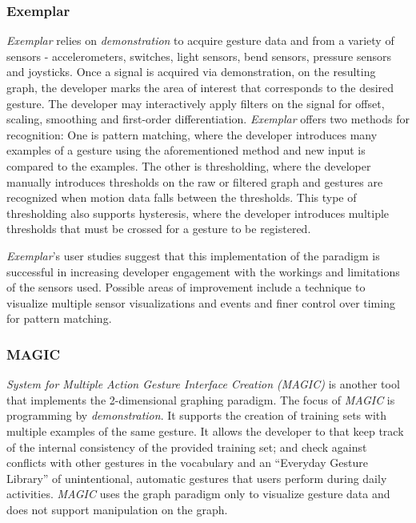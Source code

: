 \subsubsection{Exemplar}

\emph{Exemplar} \parencite{Hartmann:2007} relies on \emph{demonstration} to acquire gesture data and from a variety of sensors - accelerometers, switches, light sensors, bend sensors, pressure sensors and joysticks. Once a signal is acquired via demonstration, on the resulting graph, the developer marks the area of interest that corresponds to the desired gesture. The developer may interactively apply filters on the signal for offset, scaling, smoothing and first-order differentiation. \emph{Exemplar} offers two methods for recognition: One is pattern matching, where the developer introduces many examples of a gesture using the aforementioned method and new input is compared to the examples. The other is thresholding, where the developer manually introduces thresholds on the raw or filtered graph and gestures are recognized when motion data falls between the thresholds. This type of thresholding also supports hysteresis, where the developer introduces multiple thresholds that must be crossed for a gesture to be registered.

\emph{Exemplar}’s user studies suggest that this implementation of the paradigm is successful in increasing developer engagement with the workings and limitations of the sensors used. Possible areas of improvement include a technique to visualize multiple sensor visualizations and events and finer control over timing for pattern matching.

\subsubsection{MAGIC}

 \emph{System for Multiple Action Gesture Interface Creation (MAGIC)} is another tool that implements the 2-dimensional graphing paradigm. The focus of \emph{MAGIC} is programming by \emph{demonstration}. It supports the creation of training sets with multiple examples of the same gesture. It allows the developer to that keep track of the internal consistency of the provided training set; and check against conflicts with other gestures in the vocabulary and an “Everyday Gesture Library” of unintentional, automatic gestures that users perform during daily activities. \emph{MAGIC} uses the graph paradigm only to visualize gesture data and does not support manipulation on the graph.

